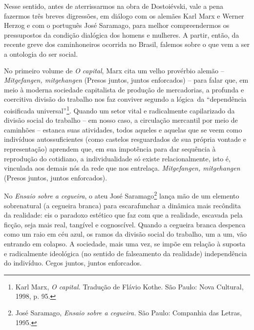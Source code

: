 Nesse sentido, antes de aterrissarmos na obra de Dostoiévski, vale a
pena fazermos três breves digressões, em diálogo com os alemães Karl
Marx e Werner Herzog e com o português José Saramago, para melhor
compreendermos os pressupostos da condição dialógica dos homens e
mulheres. A partir, então, da recente greve dos caminhoneiros ocorrida
no Brasil, falemos sobre o que vem a ser a ontologia do ser social.

No primeiro volume de \emph{O capital}, Marx cita um velho provérbio
alemão --\emph{Mitgefangen, mitgehangen} (Presos juntos, juntos
enforcados) -- para falar que, em meio à moderna sociedade capitalista
de produção de mercadorias, a profunda e coercitiva divisão do trabalho
nos faz conviver segundo a lógica~da ``dependência coisificada
universal''\footnote{Karl Marx, \emph{O capital.} Tradução de Flávio
  Kothe. São Paulo: Nova Cultural, 1998, p. 95.}. Quando um setor vital
e radicalmente capilarizado da divisão social do trabalho -- em nosso
caso, a circulação mercantil por meio de caminhões -- estanca suas
atividades, todos aqueles e aquelas que se veem como indivíduos
autossuficientes (como castelos resguardados de sua própria vontade e
representação) aprendem que, em sua impotência para dar sequência à
reprodução do cotidiano, a individualidade só existe relacionalmente,
isto é, vinculada aos demais nós da rede que nos entrelaça.
\emph{Mitgefangen, mitgehangen} (Presos juntos, juntos enforcados).

No \emph{Ensaio sobre a cegueira}, o ateu José Saramago\footnote{José
  Saramago, \emph{Ensaio sobre a cegueira.} São Paulo: Companhia das
  Letras, 1995.} lança mão de um elemento sobrenatural (a cegueira
branca) para escarafunchar a dinâmica mais recôndita da realidade: eis o
paradoxo estético que faz com que a realidade, escavada pela ficção,
seja mais real, tangível e cognoscível. Quando a cegueira branca
despenca como um raio em céu azul, os ramos da divisão social do
trabalho, um a um, vão entrando em colapso. A sociedade, mais uma vez,
se impõe em relação à suposta e radicalmente ideológica (no sentido de
falseamento da realidade) independência do indivíduo. Cegos juntos,
juntos enforcados.

